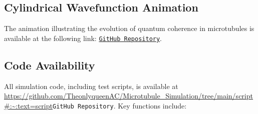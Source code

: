 \subsection{Cylindrical Wavefunction Animation}
The animation illustrating the evolution of quantum coherence in microtubules is available at the following link: 
\href{https://github.com/TheonlyqueenAC/Microtubule_Simulation/blob/main/figures/Time_Evolution_2D.mp4#:~:text=Time_Evolution_2D.mp4}{\texttt{GitHub Repository}}.

\subsection{Code Availability}
All simulation code, including test scripts, is available at \url{https://github.com/TheonlyqueenAC/Microtubule_Simulation/tree/main/script#:~:text=script}{\texttt{GitHub Repository}}. Key functions include:


